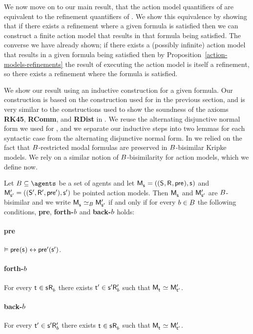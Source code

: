 We now move on to our main result, that the action model quantifiers of \logicAamlK{} are equivalent to the refinement quantifiers of \logicRmlK{}.
We show this equivalence by showing that if there exists a refinement where a given formula is satisfied then we can construct a finite action model that results in that formula being satisfied.
The converse we have already shown; if there exists a (possibly infinite) action model that results in a given formula being satisfied then by Proposition~\ref{action-models-refinements} the result of executing the action model is itself a refinement, so there exists a refinement where the formula is satisfied.

We show our result using an inductive construction for a given formula.
Our construction is based on the construction used for \logicRamlK{} in the previous section, and is very similar to the constructions used to show the soundness of the axioms {\bf RK45}, {\bf RComm}, and {\bf RDist} in \logicRmlKFF{}.
We reuse the alternating disjunctive normal form we used for \logicRmlKFF{}, and we separate our inductive steps into two lemmas for each syntactic case from the alternating disjunctive normal form.
In \logicRmlKFF{} we relied on the fact that $B$-restricted modal formulas are preserved in $B$-bisimilar Kripke models.
We rely on a similar notion of $B$-bisimilarity for action models, which we define now.

\begin{definition}
Let $\agentsB \subseteq \agents$ be a set of agents and let $\aPModelAndTuple{\aStateS}$ and $\aPModelAndTupleP{\aStateSP}$ be pointed action models.
Then $\aPModel{\aStateS}$ and ${\mathsf{M}^{\prime}_{{\mathsf{{s}}^{\prime}}}}$ are $B$-bisimilar and we write $\aPModel{\aStateS} \bisimilar[\agentsB] \aPModelP{\aStateSP}$ if and only if for every $b \in B$ the following conditions, {\bf pre}, {\bf forth-$b$} and {\bf back-$b$} holds:

\paragraph{pre}
$\entails \aPrecondition(\aStateS) \iff \aPreconditionP(\aStateSP)$.

\paragraph{forth-$b$}
For every $\aStateT \in \aSuccessorsB{\aStateS}$ there exists ${\mathsf{{t}}^{\prime}} \in {{\mathsf{{s}}^{\prime}}} {\mathsf{R}^{\prime}_{b}}$ such that $\aPModel{\aStateT} \bisimilar \aPModelP{\aStateTP}$.

\paragraph{back-$b$}
For every ${\mathsf{{t}}^{\prime}} \in {{\mathsf{{s}}^{\prime}}} {\mathsf{R}^{\prime}_{b}}$ there exists $\aStateT \in \aSuccessorsB{\aStateS}$ such that $\aPModel{\aStateT} \bisimilar \aPModelP{\aStateTP}$.
\end{definition}

